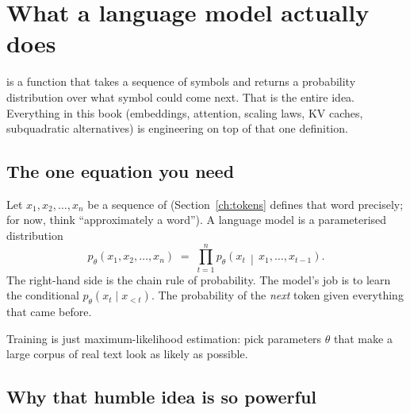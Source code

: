 \section{What a language model actually does}
\label{ch:what-lm}

 is a function that takes a sequence of symbols
and returns a probability distribution over what symbol could come next. That
is the entire idea. Everything in this book (embeddings, attention, scaling
laws, KV caches, subquadratic alternatives) is engineering on top of that
one definition.

\subsection{The one equation you need}

Let \(x_1, x_2, \ldots, x_n\) be a sequence of  (Section~\ref{ch:tokens}
defines that word precisely; for now, think ``approximately a word''). A
language model is a parameterised distribution
\begin{equation}
  p_\theta(x_1, x_2, \ldots, x_n)
  \;=\;
  \prod_{t=1}^{n} p_\theta\!\left(x_t \,\middle|\, x_1, \ldots, x_{t-1}\right).
  \label{eq:chain-rule}
\end{equation}
The right-hand side is the chain rule of probability. The model's job is to learn the conditional
\(p_\theta(x_t \mid x_{<t})\). The probability of the \emph{next} token given
everything that came before.

Training is just maximum-likelihood estimation: pick parameters \(\theta\) that
make a large corpus of real text look as likely as possible.


\subsection{Why that humble idea is so powerful}

